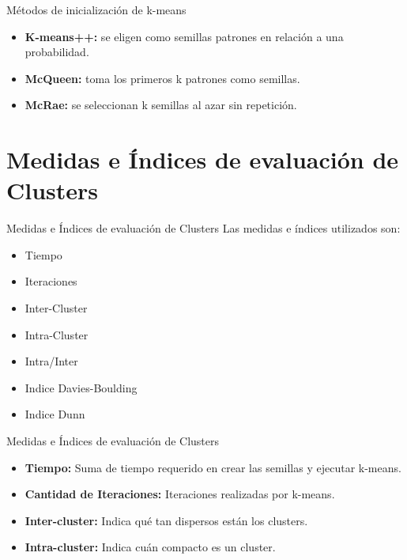 \documentclass[10pt]{beamer}
\begin{document}
\begin{frame}{Métodos de inicialización de k-means}
  \begin{itemize}
	\item \textbf{K-means++:} se eligen como semillas patrones en relación a una probabilidad. 
   	
   	\vspace{10mm}
   	\item \textbf{McQueen:} toma los primeros k patrones como semillas.

   	\vspace{10mm}
   	\item \textbf{McRae:} se seleccionan k semillas al azar sin repetición.
   	
  \end{itemize}
\end{frame}



\section{Medidas e Índices de evaluación de Clusters}

\begin{frame}[fragile]{Medidas e Índices de evaluación de Clusters}
   Las medidas e índices utilizados son:
   \begin{itemize}
	\item Tiempo
	\item Iteraciones
   	\item Inter-Cluster
	\item Intra-Cluster
    \item Intra/Inter
	\item Indice Davies-Boulding
	\item Indice Dunn
   \end{itemize}
\end{frame}

\begin{frame}{Medidas e Índices de evaluación de Clusters}
  \begin{itemize}
    \item \textbf{Tiempo:} Suma de tiempo requerido en crear las semillas y ejecutar k-means.
    \vspace{8mm}
    \item \textbf{Cantidad de Iteraciones:} Iteraciones realizadas por k-means.
   	\vspace{8mm}
   	\item \textbf{Inter-cluster:} Indica qué tan dispersos están los clusters.
   	\vspace{8mm}
   	\item \textbf{Intra-cluster:} Indica cuán compacto es un cluster.
   	
  \end{itemize}
\end{frame}
\end{document}
